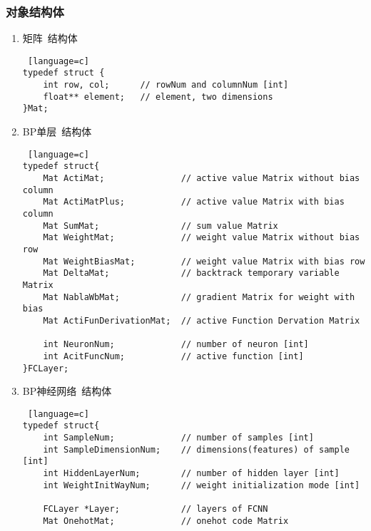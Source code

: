 \subsubsection{对象结构体}

\begin{enumerate}
  \item 矩阵~结构体
\begin{lstlisting} [language=c]
typedef struct {
	int row, col;      // rowNum and columnNum [int]
	float** element;   // element, two dimensions
}Mat;
\end{lstlisting}
  \item BP单层~结构体
\begin{lstlisting} [language=c]
typedef struct{
	Mat ActiMat;               // active value Matrix without bias column
	Mat ActiMatPlus;           // active value Matrix with bias column
	Mat SumMat;                // sum value Matrix
	Mat WeightMat;             // weight value Matrix without bias row
	Mat WeightBiasMat;         // weight value Matrix with bias row
	Mat DeltaMat;              // backtrack temporary variable Matrix
	Mat NablaWbMat;            // gradient Matrix for weight with bias
	Mat ActiFunDerivationMat;  // active Function Dervation Matrix

	int NeuronNum;             // number of neuron [int]
	int AcitFuncNum;           // active function [int]
}FCLayer;
\end{lstlisting}
  \item BP神经网络~结构体
\begin{lstlisting} [language=c]
typedef struct{
	int SampleNum;             // number of samples [int]
	int SampleDimensionNum;    // dimensions(features) of sample [int]
	int HiddenLayerNum;        // number of hidden layer [int]
	int WeightInitWayNum;      // weight initialization mode [int]

	FCLayer *Layer;            // layers of FCNN
	Mat OnehotMat;             // onehot code Matrix


\end{lstlisting}
\end{enumerate}
